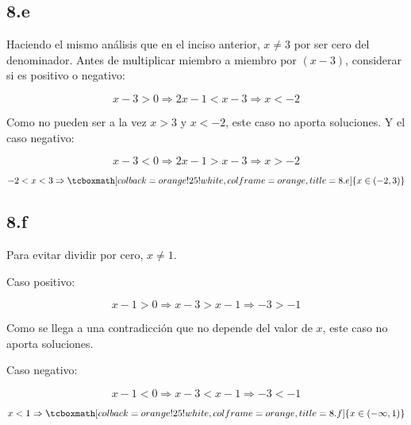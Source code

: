 \documentclass{article}
\begin{document}
\subsection*{8.e}
\label{subsec:8.e}

Haciendo el mismo análisis que en el inciso anterior, $x \neq 3$ por ser cero del denominador. Antes de multiplicar miembro a miembro por $(x-3)$, considerar si es positivo o negativo:

\begin{equation}
x - 3 > 0 \Rightarrow 2x - 1 < x - 3 \Rightarrow x < -2
\end{equation}

Como no pueden ser a la vez $x > 3$ y $x < -2$, este caso no aporta soluciones. Y el caso negativo:

\begin{equation}
x - 3 < 0 \Rightarrow 2x - 1 > x - 3 \Rightarrow x > -2
\end{equation}

\begin{equation}
-2 < x < 3 \Rightarrow \tcboxmath[colback=orange!25!white,colframe=orange, title=8.e] { x \in (-2, 3) }
\end{equation}

\subsection*{8.f}
\label{subsec:8.f}

Para evitar dividir por cero, $x \neq 1$.

Caso positivo:

\begin{equation}
x - 1 > 0 \Rightarrow x - 3 > x - 1 \Rightarrow -3 > -1
\end{equation}

Como se llega a una contradicción que no depende del valor de $x$, este caso no aporta soluciones.

Caso negativo:

\begin{equation}
x - 1 < 0 \Rightarrow x - 3 < x - 1 \Rightarrow -3 < -1
\end{equation}

\begin{equation}
x < 1 \Rightarrow \tcboxmath[colback=orange!25!white,colframe=orange, title=8.f] { x \in (-\infty, 1) }
\end{equation}
\end{document}
